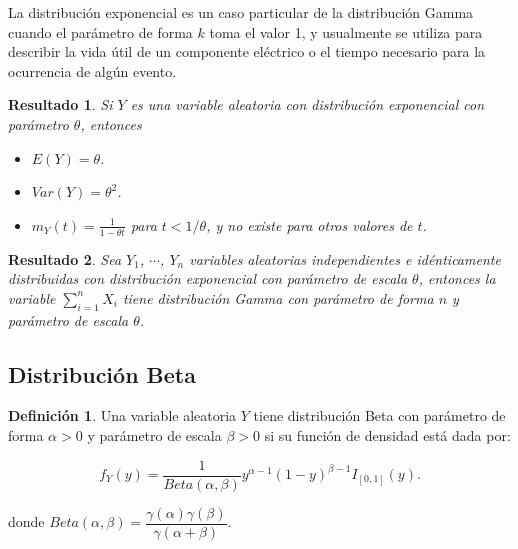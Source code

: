 \documentclass[
  10pt,
  spanish,
]{book}
\providecommand{\tightlist}{%
  \setlength{\itemsep}{0pt}\setlength{\parskip}{0pt}}
\newtheorem{proposition}{Resultado}[chapter]
\theoremstyle{definition}
\newtheorem{definition}{Definición}[chapter]
\theoremstyle{definition}
\theoremstyle{definition}
\theoremstyle{definition}
\theoremstyle{remark}
\begin{document}
La distribución exponencial es un caso particular de la distribución Gamma cuando el parámetro de forma \(k\) toma el valor 1, y usualmente se utiliza para describir la vida útil de un componente eléctrico o el tiempo necesario para la ocurrencia de algún evento.

\begin{proposition}
\protect\hypertarget{prp:unnamed-chunk-28}{}{\label{prp:unnamed-chunk-28} }Si \(Y\) es una variable aleatoria con distribución exponencial con parámetro \(\theta\), entonces

\begin{itemize}
\tightlist
\item
  \(E(Y)=\theta\).
\item
  \(Var(Y)=\theta^2\).
\item
  \(m_Y(t)=\frac{1}{1-\theta t}\) para \(t<1/\theta\), y no existe para otros valores de \(t\).
\end{itemize}
\end{proposition}

\begin{proposition}
\protect\hypertarget{prp:unnamed-chunk-29}{}{\label{prp:unnamed-chunk-29} }Sea \(Y_1\), \(\cdots\), \(Y_n\) variables aleatorias independientes e idénticamente distribuidas con distribución exponencial con parámetro de escala \(\theta\), entonces la variable \(\sum_{i=1}^nX_i\) tiene distribución Gamma con parámetro de forma \(n\) y parámetro de escala \(\theta\).
\end{proposition}

\hypertarget{distribuciuxf3n-beta}{%
\subsection{Distribución Beta}\label{distribuciuxf3n-beta}}

\begin{definition}
\protect\hypertarget{def:unnamed-chunk-30}{}{\label{def:unnamed-chunk-30} }Una variable aleatoria \(Y\) tiene distribución Beta con parámetro de forma \(\alpha>0\) y parámetro de escala \(\beta>0\) si su función de densidad está dada por:

\begin{equation}
f_Y(y)=\frac{1}{Beta(\alpha,\beta)}y^{\alpha-1}(1-y)^{\beta-1}I_{[0,1]}(y).
\end{equation}

donde \(Beta(\alpha,\beta)=\dfrac{\gamma(\alpha)\gamma(\beta)}{\gamma(\alpha+\beta)}\).
\end{definition}
\end{document}
